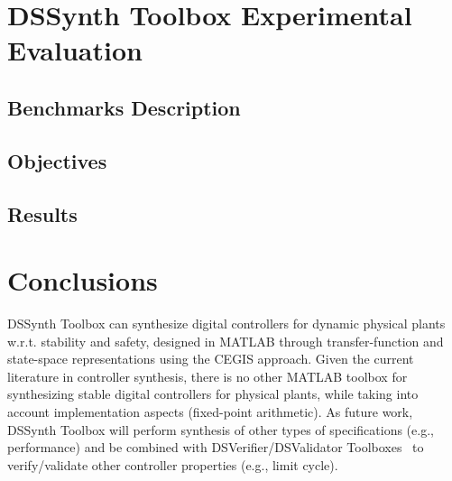 \documentclass[sigconf]{acmart}
\newcommand\tool{{DSSynth Toolbox}\xspace}
\begin{document}
\section{\tool Experimental Evaluation}

\subsection{Benchmarks Description}


\subsection{Objectives}


\subsection{Results}


\section{Conclusions}

\tool can synthesize digital controllers for dynamic physical plants 
w.r.t. stability and safety, designed in MATLAB through transfer-function 
and state-space representations using the CEGIS approach.
%
Given the current literature in controller synthesis, there is no other MATLAB toolbox 
for synthesizing stable digital controllers for physical plants, while taking into account implementation 
aspects (fixed-point arithmetic). 
%
As future work, \tool will perform synthesis of other types of specifications (e.g., performance) 
and be combined with DSVerifier/DSValidator Toolboxes~\cite{issta2017,dsvalidator} to verify/validate
 other controller properties (e.g., limit cycle). 



 
\end{document}
